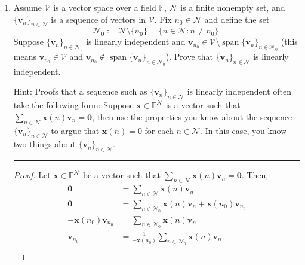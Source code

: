 \documentclass[12pt]{amsart}
\newcommand{\1}{\mathbbm{1}}
\numberwithin{equation}{section}
\numberwithin{Theorem}{section}
\theoremstyle{plain} %
\theoremstyle{definition}
\theoremstyle{remark}
\begin{document}
\begin{enumerate}[1.]
\begin{proof}
Finally, let $c\in\mathbb{F}$ and $u\in\mathbf{V}(\mathcal{X})$ such that $u=\mathbf{V}(\mathbf{x})$.
Then, for arbitrary $\mathbf{x}\in\mathcal{X}$ it can be shown that  
\begin{align*}
	c\mathbf{V}(\mathbf{x})
	&= \sum_{n\in\mathcal{N}}\mathbf{x}(n)\mathbf{v}_n \\
	&= \sum_{n\in\mathcal{N}}c(\mathbf{x}(n)\mathbf{v}_n) \\
	&= \sum_{n\in\mathcal{N}}c\mathbf{x}(n)\mathbf{v}_n \\
	&= \mathbf{V}(c\mathbf{x}).
\end{align*}
Thus, $\mathbf{V}(\mathcal{X})$ is closed under multiplication. 
\end{proof}

\newpage

\item Assume \(\mathcal{V}\) is a vector space over a field \(\mathbb{F}\), \(\mathcal{N}\) is a finite nonempty set, and \(\{\mathbf{v}_{n}\}_{n\in\mathcal{N}}\) is a sequence of vectors in \(\mathcal{V}\). Fix \(n_{0}\in\mathcal{N}\) and define the set
\[\mathcal{N}_{0} := \mathcal{N}\setminus\{n_{0}\} = \{n\in\mathcal{N} : n\neq n_{0}\}.\]
 Suppose \(\{\mathbf{v}_{n}\}_{n\in\mathcal{N}_{0}}\) is linearly independent and \(\mathbf{v}_{n_{0}}\in\mathcal{V}\setminus\operatorname{span}\{\mathbf{v}_{n}\}_{n\in\mathcal{N}_{0}}\) (this means \(\mathbf{v}_{n_{0}}\in\mathcal{V}\) and \(\mathbf{v}_{n_{0}}\notin\operatorname{span}\{\mathbf{v}_{n}\}_{n\in\mathcal{N}_{0}}\)). Prove that \(\{\mathbf{v}_{n}\}_{n\in\mathcal{N}}\) is linearly independent.


Hint: Proofs that a sequence such as \(\{\mathbf{v}_{n}\}_{n\in\mathcal{N}}\) is linearly independent often take the following form: Suppose \(\mathbf{x}\in\mathbb{F}^{\mathcal{N}}\) is a vector such that \(\sum_{n\in\mathcal{N}}\mathbf{x}(n)\mathbf{v}_{n} = \mathbf{0}\), then use the properties you know about the sequence \(\{\mathbf{v}_{n}\}_{n\in\mathcal{N}}\) to argue that \(\mathbf{x}(n) = 0\) for each \(n\in\mathcal{N}\). In this case, you know two things about \(\{\mathbf{v}_{n}\}_{n\in\mathcal{N}}\).
\\
\hrule
\bigskip

\begin{proof}
Let $\mathbf{x}\in\mathbb{F}^{\mathcal{N}}$ be a vector such that $\sum_{n\in\mathcal{N}}\mathbf{x}(n)\mathbf{v}_{n} = \mathbf{0}$. Then,\\

\begin{align*}
	\mathbf{0} &=\sum_{n\in\mathcal{N}}\mathbf{x}(n)\mathbf{v}_{n} \\
	\mathbf{0} &= \sum_{n\in\mathcal{N}_{0}}\mathbf{x}(n)\mathbf{v}_{n} +  \mathbf{x}(n_0)\mathbf{v}_{n_{0}}\\
	-\mathbf{x}(n_0)\mathbf{v}_{n_{0}} &= \sum_{n\in\mathcal{N}_{0}}\mathbf{x}(n)\mathbf{v}_{n} \\
	\mathbf{v}_{n_{0}}  &= \frac{1}{-\mathbf{x}(n_0)} \sum_{n\in\mathcal{N}_{0}}\mathbf{x}(n)\mathbf{v}_{n}. \\
\end{align*}


\end{proof}
\end{enumerate}
\end{document}
